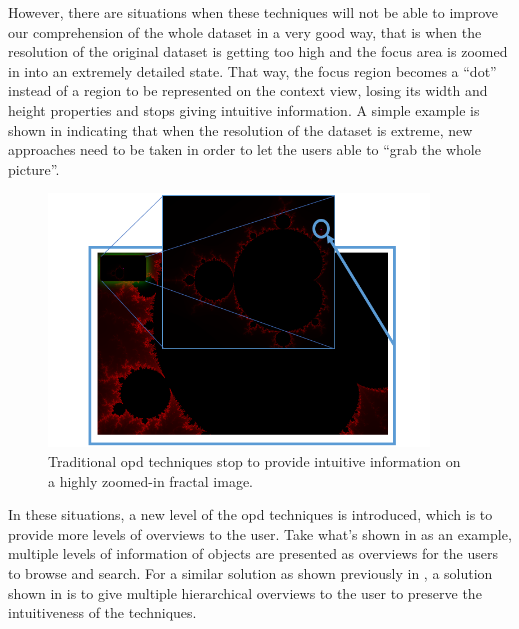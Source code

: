However, there are situations when these techniques will not be able to improve our comprehension of the whole dataset in a very good way, that is when the resolution of the original dataset is getting too high and the focus area is zoomed in into an extremely detailed state. That way, the focus region becomes a ``dot'' instead of a region to be represented on the context view, losing its width and height properties and stops giving intuitive information. A simple example is shown in  indicating that when the resolution of the dataset is extreme, new approaches need to be taken in order to let the users able to ``grab the whole picture''.

\begin{figure}[H]
\centering
\includegraphics[width=0.9\textwidth,keepaspectratio]{Figures/Chapter1/becomespoint.png}
\decoRule
\caption[Focus Region Becomes A Dot On Context Region]{Traditional \gls{opd} techniques stop to provide intuitive information on a highly zoomed-in fractal image.}
\label{fig:becomespoint}
\end{figure}

In these situations, a new level of the \gls{opd} techniques is introduced, which is to provide more levels of overviews to the user. Take what's shown in  as an example, multiple levels of information of objects are presented as overviews for the users to browse and search. For a similar solution as shown previously in , a solution shown in  is to give multiple hierarchical overviews to the user to preserve the intuitiveness of the techniques.

